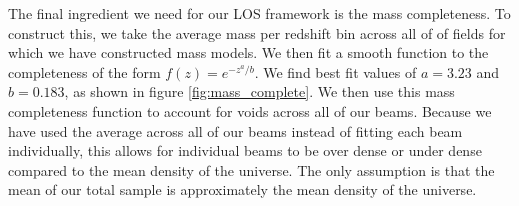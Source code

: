 The final ingredient we need for our LOS framework is the mass completeness. To construct this, we take the average mass per redshift bin across all of of fields for which we have constructed mass models. We then fit a smooth function to the completeness of the form $f(z) = e^{-z^a / b}$. We find best fit values of $a = 3.23$ and $b = 0.183$, as shown in figure \ref{fig:mass_complete}. We then use this mass completeness function to account for voids across all of our beams. Because we have used the average across all of our beams instead of fitting each beam individually, this allows for individual beams to be over dense or under dense compared to the mean density of the universe. The only assumption is that the mean of our total sample is approximately the mean density of the universe.  
  
  